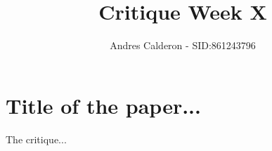 \documentclass[a4paper,10pt]{scrartcl}
\title{Critique Week X}
\author{Andres Calderon - SID:861243796}
\begin{document}
\maketitle
\thispagestyle{empty}

\section*{Title of the paper...}
The critique...

\end{document}
